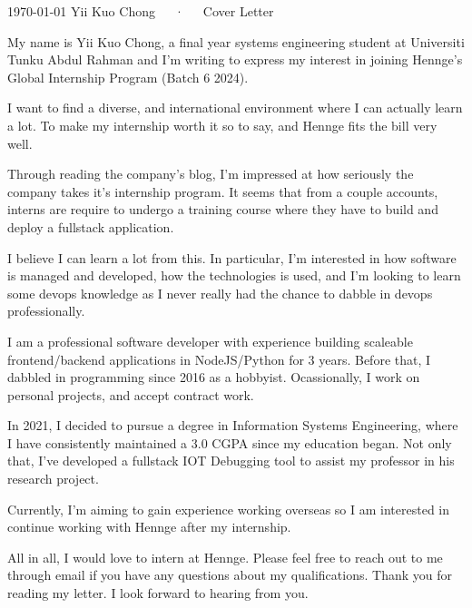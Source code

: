 \documentclass[11pt, a4paper]{awesome-cv}
\begin{document}
\makecvheader[R]

\makecvfooter
  {\today}
  {Yii Kuo Chong~~~·~~~Cover Letter}
  {}

\makelettertitle

\begin{cvletter}

My name is Yii Kuo Chong, a final year systems engineering student at Universiti Tunku Abdul Rahman and I'm writing to express my interest in joining Hennge's Global Internship Program (Batch 6 2024).

I want to find a diverse, and international environment where I can actually learn a lot. To make my internship worth it so to say, and Hennge fits the bill very well.

Through reading the company's blog, I'm impressed at how seriously the company takes it's internship program. It seems that from a couple accounts, interns are require to undergo a training course where they have to build and deploy a fullstack application. 

I believe I can learn a lot from this. In particular, I'm interested in how software is managed and developed, how the technologies is used, and I'm looking to learn some devops knowledge as I never really had the chance to dabble in devops professionally.

I am a professional software developer with experience building scaleable frontend/backend applications in NodeJS/Python for 3 years. Before that, I dabbled in programming since 2016 as a hobbyist. Ocassionally, I work on personal projects, and accept contract work.

In 2021, I decided to pursue a degree in Information Systems Engineering, where I have consistently maintained a 3.0 CGPA since my education began. Not only that, I've developed a fullstack IOT Debugging tool to assist my professor in his research project.

Currently, I'm aiming to gain experience working overseas so I am interested in continue working with Hennge after my internship.

All in all, I would love to intern at Hennge. Please feel free to reach out to me through email if you have any questions about my qualifications. Thank you for reading my letter. I look forward to hearing from you.

\end{cvletter}

\makeletterclosing
\end{document}
